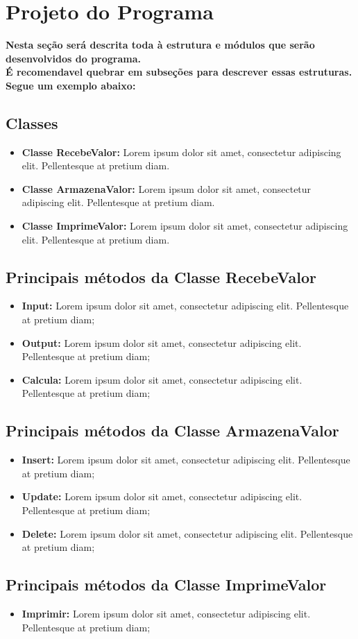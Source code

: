\section{Projeto do Programa}
\textbf{Nesta seção será descrita toda à estrutura e módulos que serão desenvolvidos do programa.\\
É recomendavel quebrar em subseções para descrever essas estruturas.\\
Segue um exemplo abaixo:}


\label{sec::projeto}
\subsection{Classes}
\begin{itemize}
\item \textbf{Classe RecebeValor:} Lorem ipsum dolor sit amet, consectetur adipiscing elit. Pellentesque at pretium diam. 
\item \textbf{Classe ArmazenaValor:} Lorem ipsum dolor sit amet, consectetur adipiscing elit. Pellentesque at pretium diam. 
\item \textbf{Classe ImprimeValor:} Lorem ipsum dolor sit amet, consectetur adipiscing elit. Pellentesque at pretium diam.
\end{itemize}

\newpage
\subsection{Principais métodos da Classe RecebeValor}
\begin{itemize}
\item \textbf{Input:} Lorem ipsum dolor sit amet, consectetur adipiscing elit. Pellentesque at pretium diam;
\item \textbf{Output:} Lorem ipsum dolor sit amet, consectetur adipiscing elit. Pellentesque at pretium diam;
\item \textbf{Calcula:} Lorem ipsum dolor sit amet, consectetur adipiscing elit. Pellentesque at pretium diam;
\end{itemize}


\subsection{Principais métodos da Classe ArmazenaValor}
\begin{itemize}
\item \textbf{Insert:} Lorem ipsum dolor sit amet, consectetur adipiscing elit. Pellentesque at pretium diam;
\item \textbf{Update:} Lorem ipsum dolor sit amet, consectetur adipiscing elit. Pellentesque at pretium diam;
\item \textbf{Delete:} Lorem ipsum dolor sit amet, consectetur adipiscing elit. Pellentesque at pretium diam;
\end{itemize}


\subsection{Principais métodos da Classe ImprimeValor}
\begin{itemize}
\item \textbf{Imprimir:} Lorem ipsum dolor sit amet, consectetur adipiscing elit. Pellentesque at pretium diam;
\end{itemize}